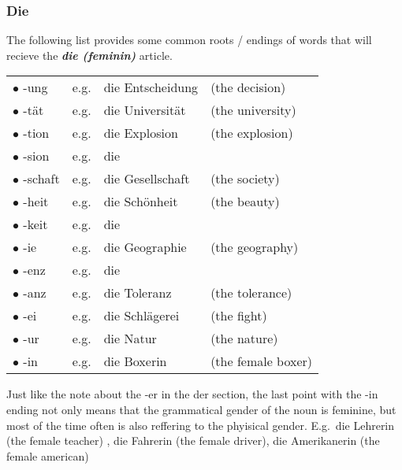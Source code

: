 \documentclass[a4paper,12pt]{article}
\begin{document}
\subsubsection{\bf{Die}}
\begin{adjustwidth}{3em}{0pt}
\label{sec:die}

The following list provides some common roots / endings of words that will
recieve the \textbf{\textit{die (feminin)}} article.


\vspace{0.3cm}
\begin{tabular}{l r l l}

\rowcolor{white}  $\bullet$ -ung    & e.g. & die Entscheidung & (the decision)\\
\rowcolor{white}  $\bullet$ -tät    & e.g. & die Universität  & (the university)\\
\rowcolor{white}  $\bullet$ -tion   & e.g. & die Explosion    & (the explosion)\\
\rowcolor{white}  $\bullet$ -sion   & e.g. & die              & \\
\rowcolor{white}  $\bullet$ -schaft & e.g. & die Gesellschaft & (the society) \\
\rowcolor{white}  $\bullet$ -heit   & e.g. & die Schönheit    & (the beauty) \\
\rowcolor{white}  $\bullet$ -keit   & e.g. & die              & \\
\rowcolor{white}  $\bullet$ -ie     & e.g. & die Geographie   & (the geography) \\
\rowcolor{white}  $\bullet$ -enz    & e.g. & die              & \\
\rowcolor{white}  $\bullet$ -anz    & e.g. & die Toleranz     & (the tolerance) \\
\rowcolor{white}  $\bullet$ -ei     & e.g. & die Schlägerei   & (the fight) \\
\rowcolor{white}  $\bullet$ -ur     & e.g. & die Natur        & (the nature) \\
\rowcolor{white}  $\bullet$ -in     & e.g. & die Boxerin      & (the female boxer)\\

\end{tabular}
\vspace{0.3cm}
\newline


Just like the note about the -er in the der section, the last point with the -in
ending not only means that the grammatical gender of the noun is
feminine, but most of the time often is also reffering to the phyisical gender.
E.g.\ die Lehrerin (the female teacher) , die Fahrerin (the female driver), die
Amerikanerin (the female american)


\end{adjustwidth}
\end{document}
